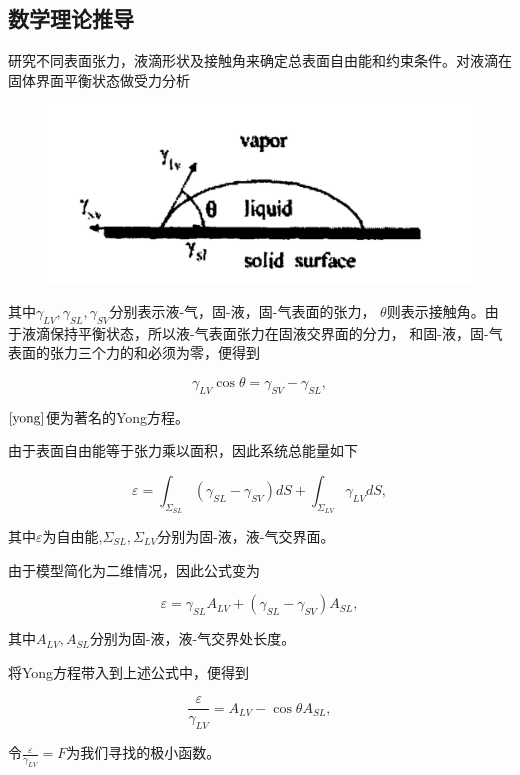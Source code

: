 \documentclass[12pt,oneside,a4paper]{article}
\begin{document}
\subsection{数学理论推导}
研究不同表面张力，液滴形状及接触角来确定总表面自由能和约束条件。对液滴在固体界面平衡状态做受力分析
\begin{figure}[H]
	\centering
	\includegraphics[width=0.5\linewidth]{figure/force.png}
	\label{fig:1}
\end{figure}
\noindent 其中$\gamma_{LV},\gamma_{SL},\gamma_{SV}$分别表示液-气，固-液，固-气表面的张力，
$\theta$则表示接触角。由于液滴保持平衡状态，所以液-气表面张力在固液交界面的分力，
和固-液，固-气表面的张力三个力的和必须为零，便得到

\begin{equation}\label{yong}
\gamma_{L V} \cos \theta=\gamma_{S V}-\gamma_{S L},
\end{equation}

\noindent $\ref{yong}$便为著名的Yong方程\cite{young}。

由于表面自由能等于张力乘以面积\cite{qin}，因此系统总能量如下

\begin{equation*}
\varepsilon=\int_{\Sigma_{SL}} (\gamma_{SL}-\gamma_{SV}) d S+\int_{\Sigma_{LV}} \gamma_{LV} d S,
\end{equation*}

\noindent 其中$\varepsilon$为自由能,$\Sigma_{SL},\Sigma_{LV}$分别为固-液，液-气交界面。

由于模型简化为二维情况，因此公式变为

\begin{equation*}
\varepsilon=\gamma_{SL}A_{LV}+(\gamma_{SL}-\gamma_{SV})A_{SL},
\end{equation*}

\noindent 其中$A_{LV},A_{SL}$分别为固-液，液-气交界处长度。

将Yong方程带入到上述公式中，便得到

\begin{equation*}
\frac{\varepsilon}{\gamma_{LV}}=A_{LV}-\cos \theta A_{SL},
\end{equation*}

\noindent 令$\frac{\varepsilon}{\gamma_{LV}} = F$为我们寻找的极小函数。
\end{document}
